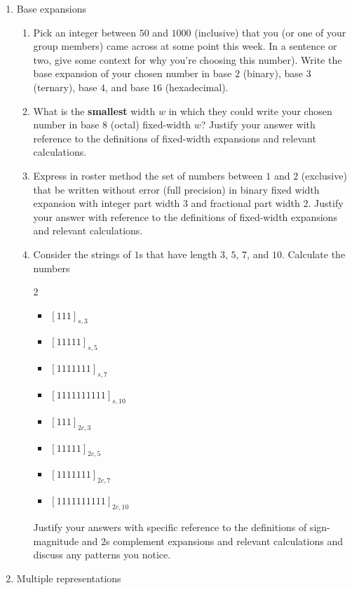 \begin{enumerate}[labelindent=0pt, leftmargin=0pt]
\item Base expansions
    \begin{enumerate}
        \item Pick an integer between $50$ and $1000$ (inclusive) that you (or one of your
        group members) came across at some point this week. 
        In a sentence or two, give some context for why you're choosing this number). 
        Write the base expansion of your chosen number in base $2$ (binary), base $3$ (ternary), base $4$, and base $16$ (hexadecimal).
        \item What is the {\bf smallest} width $w$ in which they could write your chosen number in base $8$ (octal) 
        fixed-width $w$? Justify your answer with reference to the definitions of fixed-width expansions and relevant calculations.
        \item Express in roster method the set of numbers between $1$ and $2$ (exclusive) that be written without error 
        (full precision)
        in binary fixed width expansion with integer part width $3$ and fractional part width $2$. Justify your answer with 
        reference to the definitions of fixed-width expansions and relevant calculations.
        \item Consider the strings of $1$s that have length $3$, $5$, $7$, and $10$.
        Calculate the numbers 
        \begin{multicols}{2}
            \begin{itemize}
            \item[] $[111]_{s,3}$
            \item[] $[11111]_{s,5}$
            \item[] $[1111111]_{s,7}$
            \item[] $[1111111111]_{s,10}$
            \item[] $[111]_{2c,3}$
            \item[] $[11111]_{2c,5}$
            \item[] $[1111111]_{2c,7}$
            \item[] $[1111111111]_{2c,10}$
            \end{itemize}
        \end{multicols}
        Justify your answers with specific reference to the definitions of sign-magnitude and $2$s complement expansions and relevant calculations and discuss any patterns you notice.
    \end{enumerate}

\item Multiple representations


\end{enumerate}
